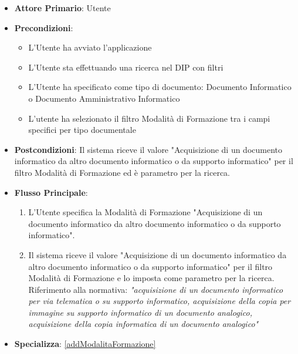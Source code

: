 \begin{itemize}
      \item \textbf{Attore Primario}: Utente
      \item \textbf{Precondizioni}: 
      \begin{itemize}
            \item L'Utente ha avviato l'applicazione
            \item L'Utente sta effettuando una ricerca nel DIP con filtri
            \item L'Utente ha specificato come tipo di documento: Documento Informatico o Documento Amministrativo Informatico
            \item L'utente ha selezionato il filtro Modalità di Formazione tra i campi specifici per tipo documentale
      \end{itemize}
      \item \textbf{Postcondizioni}: Il sistema riceve il valore "Acquisizione di un documento informatico da altro documento informatico o da supporto informatico" per il filtro Modalità di Formazione ed è parametro per la ricerca.
      \item \textbf{Flusso Principale}:
      \begin{enumerate}
            \item L'Utente specifica la Modalità di Formazione "Acquisizione di un documento informatico da altro documento informatico o da supporto informatico".
            \item Il sistema riceve il valore "Acquisizione di un documento informatico da altro documento informatico o da supporto informatico" per il filtro Modalità di Formazione e lo imposta come parametro per la ricerca. Riferimento alla normativa: \textit{"acquisizione di un documento informatico per via telematica o su supporto informatico, acquisizione della copia per immagine su supporto informatico di un documento analogico, acquisizione della copia informatica di un documento analogico"}
      \end{enumerate}
      \item \textbf{Specializza}: \ref{addModalitaFormazione}
\end{itemize}

